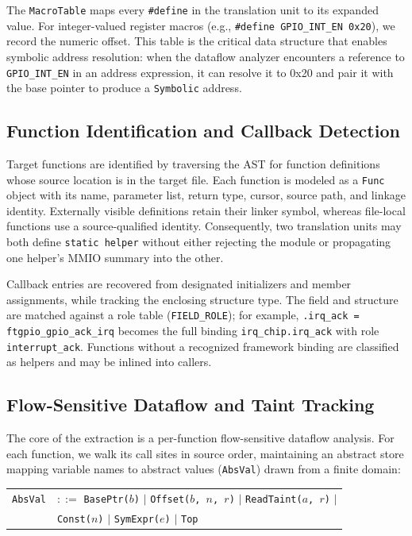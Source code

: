 \documentclass[sigconf,review]{acmart}
\begin{document}
The \texttt{MacroTable} maps every \texttt{\#define} in the translation unit to its expanded value. For integer-valued register macros (e.g., \texttt{\#define GPIO\_INT\_EN 0x20}), we record the numeric offset. This table is the critical data structure that enables symbolic address resolution: when the dataflow analyzer encounters a reference to \texttt{GPIO\_INT\_EN} in an address expression, it can resolve it to 0x20 and pair it with the base pointer to produce a \texttt{Symbolic} address.

\subsection{Function Identification and Callback Detection}

Target functions are identified by traversing the AST for function definitions whose source location is in the target file. Each function is modeled as a \texttt{Func} object with its name, parameter list, return type, cursor, source path, and linkage identity. Externally visible definitions retain their linker symbol, whereas file-local functions use a source-qualified identity. Consequently, two translation units may both define \texttt{static helper} without either rejecting the module or propagating one helper's MMIO summary into the other.

Callback entries are recovered from designated initializers and member assignments, while tracking the enclosing structure type. The field and structure are matched against a role table (\texttt{FIELD\_ROLE}); for example, \texttt{.irq\_ack = ftgpio\_gpio\_ack\_irq} becomes the full binding \texttt{irq\_chip.irq\_ack} with role \texttt{interrupt\_ack}. Functions without a recognized framework binding are classified as helpers and may be inlined into callers.

\subsection{Flow-Sensitive Dataflow and Taint Tracking}

The core of the extraction is a per-function flow-sensitive dataflow analysis. For each function, we walk its call sites in source order, maintaining an abstract store mapping variable names to abstract values (\texttt{AbsVal}) drawn from a finite domain:

\begin{center}
\begin{tabular}{ll}
\texttt{AbsVal} & $::=$ \texttt{BasePtr($b$)} $|$ \texttt{Offset($b$, $n$, $r$)} $|$
\texttt{ReadTaint($a$, $r$)} $|$ \\
& \quad\;\; \texttt{Const($n$)} $|$ \texttt{SymExpr($e$)} $|$ \texttt{Top} \\
\end{tabular}
\end{center}
\end{document}

